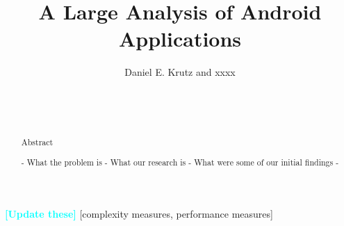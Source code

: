 \documentclass{sig-alternate}
\newcommand{\todo}[1]{\textcolor{cyan}{\textbf{[#1]}}}
\begin{document}

\title{A Large Analysis of Android Applications}

%
\author{
%
%
\alignauthor
Daniel E. Krutz and xxxx\\
       \\
       \\
       \\
}


\maketitle
\begin{abstract}

Abstract

- What the problem is
- What our research is
- What were some of our initial findings
-




\end{abstract}

\todo{Update these}
[complexity measures, performance measures]
\end{document}
